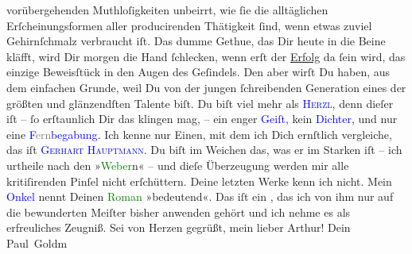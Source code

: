                vorübergehenden Muthloſigkeiten unbeirrt, wie ſie die alltäglichen Erſcheinungsformen
               aller  producirenden Thätigkeit ſind, wenn etwas zuviel Gehirnſchmalz verbraucht iſt.
               Das dumme Gethue, das Dir heute in die Beine kläfft, wird Dir morgen die Hand
               ſchlecken, wenn erſt der \uline{Erfolg} da ſein wird, das
               einzige Beweisſtück in den Augen des Geſindels. Den aber wirſt Du haben, aus dem
               einfachen Grunde, weil Du von der\strikeout{\textcolor{gray}{n}} jungen ſchreibenden {\pb}Generation eines der
               größten und glänzendſten Talente biſt. Du biſt viel mehr als \textsc{\textcolor{blue}{Herzl}{}\ledrightnote{\textcolor{blue}{Theodor Herzl}}}, denn dieſer iſt – ſo erſtaunlich Dir das klingen mag, – ein enger \textcolor{blue}{Geiſt}{}, kein \textcolor{blue}{Dichter}{}, und nur eine \textcolor{blue}{F\textcolor{gray}{ern}begabung}{}. Ich kenne
               nur Einen, mit dem ich Dich ernſtlich vergleiche, das iſt \textsc{\textcolor{blue}{Gerhart Hauptmann}{}\ledrightnote{\textcolor{blue}{Gerhart Hauptmann}}}. Du biſt im Weichen das, was er im Starken iſt – ich urtheile nach den »\textcolor{green}{Weber}{}\ledrightnote{\textcolor{green}{Die Weber}}n« – und dieſe Überzeugung werden mir alle
               kritiſirenden Pinſel nicht erſchüttern. Deine letzten Werke kenn ich nicht. Mein \textcolor{blue}{Onkel}{} nennt Deinen \textcolor{green}{Roman}{} »bedeutend«. Das iſt ein
                  \label{K_L02711-6v}\label{K_L02711-6h}, das ich von ihm nur auf
               die bewunderten Meiſter bisher anwenden gehört und ich nehme es als erfreuliches
               Zeugniß.\pend
           \pstart Sei von Herzen gegrüßt, mein lieber Arthur! Dein \spacefill\mbox{Paul Goldm}\pend{}\endnumbering{}\begin{anhang}\end{anhang}
      